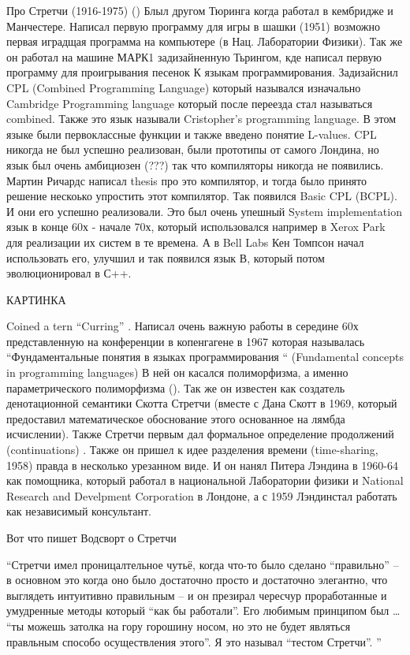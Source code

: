 \documentclass[14pt]{matmex-diploma-custom}
\begin{document}
Про Стретчи (1916-1975)  ()
Блыл другом Тюринга когда работал в кембридже и Манчестере. Написал первую программу для игры в шашки (1951) возможно первая иградщая программа на компьютере (в Нац. Лаборатории Физики). Так же он работал на машине МАРК1 задизайненную Тьрингом, кде написал первую программу для проигрывания песенок
К языкам программирования. Задизайснил CPL (Combined Programming Language) который назывался изначально Cambridge Programming language который после переезда стал называться combined. Также это язык называли Cristopher’s programming language. В этом языке были первоклассные функции и также введено понятие L-values. CPL никогда не был успешно реализован, были прототипы от самого Лондина, но язык был очень амбициозен (???)  так что компиляторы никогда не появились. Мартин Ричардс написал thesis про это компилятор, и тогда было принято решение нескоько упростить этот компилятор. Так появился Basic CPL (BCPL). И они его успешно реализовали. Это был очень упешный 
 System implementation язык в конце 60х - начале 70х, который использовался например в Xerox Park для реализации их систем в те времена. А в Bell Labs Кен Томпсон начал использовать его, улучшил и так появился язык В, который потом эволюционировал  в С++.

КАРТИНКА

Coined a tern “Curring” . Написал очень важную работы в середине 60х представленную на конференции в копенгагене в 1967 которая называлась  “Фундаментальные понятия в языках программирования “ (Fundamental concepts in programming languages) В ней он касался полиморфизма, а именно параметрического полиморфизма (). Так же он известен как создатель денотационной семантики Скотта Стретчи (вместе с Дана Скотт в 1969, который предоставил математическое обоснование этого основанное на лямбда исчислении). Также Стретчи первым дал формальное определение продолжений (continuations) . Также он пришел к идее разделения времени (time-sharing, 1958) правда в несколько урезанном виде. И он нанял Питера Лэндина  в 1960-64 как помощника, который работал в национальной Лаборатории физики и National Research and Develpment Corporation  в Лондоне, а с 1959 Лэндинстал  работать как независимый консультант. 

Вот что пишет Водсворт о Стретчи

“Стретчи имел проницалтельное чутьё, когда что-то было сделано “правильно” -- в основном это когда оно было достаточно просто и достаточно элегантно, что выглядеть интуитивно правильным -- и он презирал чересчур проработанные  и умудренные методы который “как бы работали”. Его любимым принципом был … “ты можешь затолка   на гору горошину носом, но это не будет являться правльным способо осуществления этого”. Я это называл “тестом Стретчи”.
”
\end{document}
